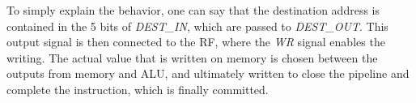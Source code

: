 To simply explain the behavior, one can say that the destination address is contained in the 5 bits of \textit{DEST\_IN}, which are passed to \textit{DEST\_OUT}. This output signal is then connected to the \textsc{RF}, where the \textit{WR} signal enables the writing. The actual value that is written on memory is chosen between the outputs from memory and ALU, and ultimately written to close the pipeline and complete the instruction, which is finally committed.




